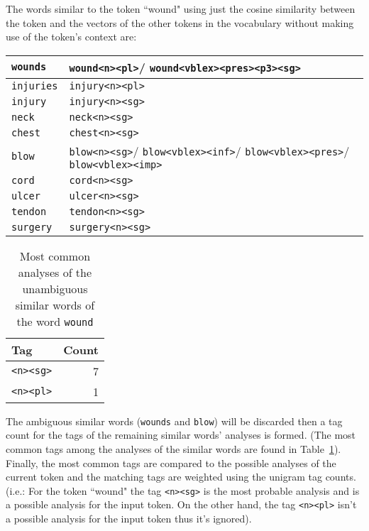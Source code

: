 \documentclass[free]{flammie}
\begin{document}
The words similar to the token ``wound" using just the cosine similarity between
the token and the vectors of the other tokens in the vocabulary without making
use of the token's context are:


\begin{tabular}{ |p{2cm}|p{5.5cm}|}
 \hline
\texttt{wounds}& \texttt{wound<n><pl>}/
\texttt{wound<vblex><pres><p3><sg>}\\
\hline
\texttt{injuries}& \texttt{injury<n><pl>}\\
\hline
\texttt{injury}& \texttt{injury<n><sg>}\\
\hline
\texttt{neck}& \texttt{neck<n><sg>}\\
\hline
\texttt{chest}& \texttt{chest<n><sg>}\\
\hline
\texttt{blow}& \texttt{blow<n><sg>}/
\texttt{blow<vblex><inf>}/
\texttt{blow<vblex><pres>}/
\texttt{blow<vblex><imp>}\\
\hline
\texttt{cord}& \texttt{cord<n><sg>}\\
\hline
\texttt{ulcer}& \texttt{ulcer<n><sg>}\\
\hline
\texttt{tendon}& \texttt{tendon<n><sg>}\\
\hline
\texttt{surgery}& \texttt{surgery<n><sg>}\\
\hline
\end{tabular}

\begin{table}
\caption{Most common analyses of the unambiguous similar words of the word
    \texttt{wound}}\label{table:freq-analyses}
\centering
\begin{tabular}{ lr}
\toprule
 \textbf{Tag} & \textbf{Count}\\
 \midrule
\texttt{<n><sg>}& 7\\
\texttt{<n><pl>} & 1\\
 \bottomrule
\end{tabular}
\end{table}

The ambiguous similar words (\texttt{wounds} and \texttt{blow}) will be
discarded then a tag count for the tags of the remaining similar words' analyses
is formed. (The most common tags among the analyses of the similar words are
found in Table~\ref{table:freq-analyses}).
Finally, the most common tags are compared to the possible analyses of the
current token and the matching tags are weighted using the unigram tag counts.
(i.e.: For the token ``wound" the tag \texttt{<n><sg>} is the most probable
analysis and is a possible analysis for the input token. On the other hand, the
tag \texttt{<n><pl>} isn't a possible analysis for the input token thus it's
ignored).
\end{document}

